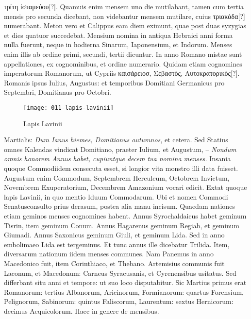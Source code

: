  \textgreek{τρίτη ἰσταμεύου[?]}.
Quamuis
enim mensem uno die mutilabant, tamen cum tertia mensis
pro secunda dicebant, non videbantur mensem mutilare, cuius
\textgreek{τριακάδα[?]} numerabant.
Meton vero et Calippus eam diem eximunt,
quae post duas syzygias et dies quatuor succedebat.
Mensium nomina
in antiqua Hebraici anni forma nulla fuerunt, neque in hodierna
Sinarum, Iaponensium, et Indorum.
Menses enim illis ab ordine
primi, secundi, tertii dicuntur.
In anno Romano mistae sunt appellationes,
ex cognominibus, et ordine numerario.
Quidam etiam cognomines
imperatorum Romanorum, ut Cypriis \textgreek{καισάρειοσ, Σεβαστὸς,
Αυτοκρατορικὸς[?]}.
Romanis ipsus Iulius, Augustus: et temporibus Domitiani
Germanicus pro Septembri, Domitianus pro Octobri.
\begin{figure}[t]
  \centering
  \texttt{[image: 011-lapis-lavinii]}
  \caption{Lapis Lavinii}
  \label{fig:lapis-lavinii}
\end{figure}
Martialis:
 \textit{Dum Ianus hiemes, Domitianus
autumnos}, et cetera.
Sed Statius omnes
Kalendas vindicat Domitiano,
praeter Iulium, et Augustum,
– \textit{Nondum omnis honorem
Annus habet, cupiuntque decem tua
nomina menses.}
Insania quoque
Commodiidem consecuta esset, si
longior vita monstro illi data fuisset.
Augustum enim Commodum,
Septembrem Herculeum, Octobrem
Invictum, Novembrem
Exuperatorium, Decembrem
Amazonium vocari edicit.
Extat
quoque lapis Lavinii, in quo mentio
Iduum Commodarum.
Ubi et
nomen Commodi Senatusconsulto prius derasum, postea alia manu
incisum.
%
Quaedam nationes etiam geminos menses cognomines habent.
Annus Syrochaldaicus habet geminum Tisrin, item geminum Conum.
Annus Hagarenus geminum Regiab, et geminum Giumadi.
Annus Saxonicus geminum Giuli, et geminum Lida.
Sed in
anno embolimaeo Lida est tergeminus.
Et tunc annus ille dicebatur
Trilida.
Item, diversarum nationum iidem menses communes.
Nam
Panemus in anno Macedonico fuit, item Corinthiaco, et Thebano.
Artemisius communis fuit Laconum, et Macedonum: Carneus Syracusanis,
et Cyrenensibus usitatus.
Sed differbant situ anni et tempore:
ut suo loco disputabitur.
Sic Martius primus erat Romanorum:
tertius Albanorum, Aricinorum, Formianorum: quartus Forensium,
Pelignorum, Sabinorum: quintus Faliscorum, Laurentum:
sextus Hernicorum: decimus Aequicolorum.
Haec in genere
de mensibus.
